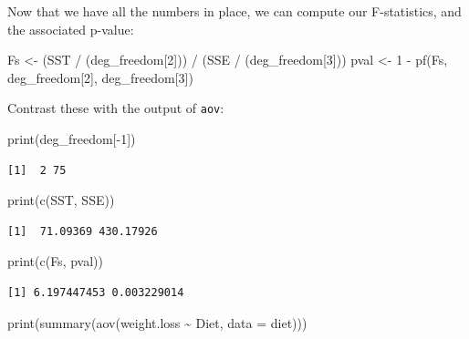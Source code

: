 \documentclass[
  letterpaper,
  DIV=11,
  numbers=noendperiod]{scrreprt}
\newenvironment{Shaded}{\begin{snugshade}}{\end{snugshade}}
\newcommand{\AttributeTok}[1]{\textcolor[rgb]{0.40,0.45,0.13}{#1}}
\newcommand{\DecValTok}[1]{\textcolor[rgb]{0.68,0.00,0.00}{#1}}
\newcommand{\FunctionTok}[1]{\textcolor[rgb]{0.28,0.35,0.67}{#1}}
\newcommand{\NormalTok}[1]{\textcolor[rgb]{0.00,0.23,0.31}{#1}}
\newcommand{\OtherTok}[1]{\textcolor[rgb]{0.00,0.23,0.31}{#1}}
\newcommand{\SpecialCharTok}[1]{\textcolor[rgb]{0.37,0.37,0.37}{#1}}
\begin{document}
Now that we have all the numbers in place, we can compute our
F-statistics, and the associated p-value:

\begin{Shaded}
\begin{Highlighting}[]
\NormalTok{Fs }\OtherTok{\textless{}{-}}\NormalTok{ (SST }\SpecialCharTok{/}\NormalTok{ (deg\_freedom[}\DecValTok{2}\NormalTok{])) }\SpecialCharTok{/}\NormalTok{ (SSE }\SpecialCharTok{/}\NormalTok{ (deg\_freedom[}\DecValTok{3}\NormalTok{]))}
\NormalTok{pval }\OtherTok{\textless{}{-}} \DecValTok{1} \SpecialCharTok{{-}} \FunctionTok{pf}\NormalTok{(Fs, deg\_freedom[}\DecValTok{2}\NormalTok{], deg\_freedom[}\DecValTok{3}\NormalTok{])}
\end{Highlighting}
\end{Shaded}

Contrast these with the output of \texttt{aov}:

\begin{Shaded}
\begin{Highlighting}[]
\FunctionTok{print}\NormalTok{(deg\_freedom[}\SpecialCharTok{{-}}\DecValTok{1}\NormalTok{])}
\end{Highlighting}
\end{Shaded}

\begin{verbatim}
[1]  2 75
\end{verbatim}

\begin{Shaded}
\begin{Highlighting}[]
\FunctionTok{print}\NormalTok{(}\FunctionTok{c}\NormalTok{(SST, SSE))}
\end{Highlighting}
\end{Shaded}

\begin{verbatim}
[1]  71.09369 430.17926
\end{verbatim}

\begin{Shaded}
\begin{Highlighting}[]
\FunctionTok{print}\NormalTok{(}\FunctionTok{c}\NormalTok{(Fs, pval))}
\end{Highlighting}
\end{Shaded}

\begin{verbatim}
[1] 6.197447453 0.003229014
\end{verbatim}

\begin{Shaded}
\begin{Highlighting}[]
\FunctionTok{print}\NormalTok{(}\FunctionTok{summary}\NormalTok{(}\FunctionTok{aov}\NormalTok{(weight.loss }\SpecialCharTok{\textasciitilde{}}\NormalTok{ Diet, }\AttributeTok{data =}\NormalTok{ diet)))}
\end{Highlighting}
\end{Shaded}
\end{document}
